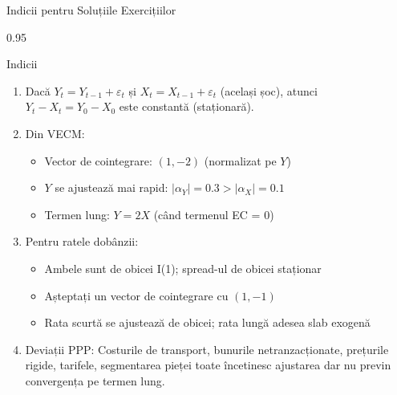 \documentclass[9pt, aspectratio=169, t]{beamer}
\begin{document}
\begin{frame}{Indicii pentru Soluțiile Exercițiilor}
    \begin{cminipage}{0.95\textwidth}
    {\footnotesize
    \begin{block}{Indicii}
        \begin{enumerate}\setlength{\itemsep}{1pt}
            \item Dacă $Y_t = Y_{t-1} + \varepsilon_t$ și $X_t = X_{t-1} + \varepsilon_t$ (același șoc), atunci $Y_t - X_t = Y_0 - X_0$ este constantă (staționară).

            \item Din VECM:
                \begin{itemize}\setlength{\itemsep}{0pt}
                    \item Vector de cointegrare: $(1, -2)$ (normalizat pe $Y$)
                    \item $Y$ se ajustează mai rapid: $|\alpha_Y| = 0.3 > |\alpha_X| = 0.1$
                    \item Termen lung: $Y = 2X$ (când termenul EC = 0)
                \end{itemize}

            \item Pentru ratele dobânzii:
                \begin{itemize}\setlength{\itemsep}{0pt}
                    \item Ambele sunt de obicei I(1); spread-ul de obicei staționar
                    \item Așteptați un vector de cointegrare cu $(1, -1)$
                    \item Rata scurtă se ajustează de obicei; rata lungă adesea slab exogenă
                \end{itemize}

            \item Deviații PPP: Costurile de transport, bunurile netranzacționate, prețurile rigide, tarifele, segmentarea pieței toate încetinesc ajustarea dar nu previn convergența pe termen lung.
        \end{enumerate}
    \end{block}
    }
    \end{cminipage}
\end{frame}
\end{document}
